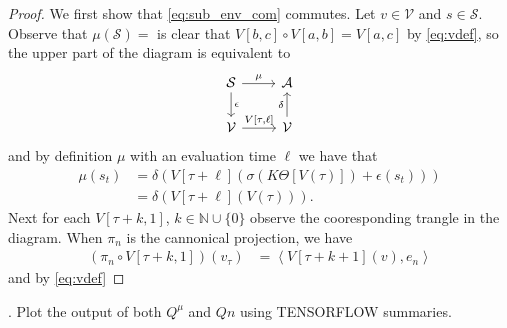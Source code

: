\documentclass{article} %
\numberwithin{equation}{subsection}
\numberwithin{theorem}{subsection}
\def\scriptv{{\mathcal V}}
\def\scripta{{\mathcal A}}
\def\scripts{{\mathcal S}}
\begin{document}
\begin{proof}
	We first show that \eqref{eq:sub_env_com} commutes. Let $v \in \scriptv$ and $s \in \scripts$. Observe that
	$\mu(\scripts) = $
	 is clear that $V[b,c]\circ V[a,b] = V[a,c]$ by \eqref{eq:vdef}, so
	the upper part of the diagram is equivalent to 
	\begin{equation}
		\begin{tikzcd}
			\scripts \arrow{r}{\mu}\arrow{d}{\epsilon} & \scripta \\
			\scriptv \arrow{r}{V[\tau, \ell]} & \scriptv \arrow{u}{\delta}
		\end{tikzcd}
	\end{equation}
	and by definition $\mu$ with an evaluation time $\ell$ we have that
	\begin{equation}
		\begin{aligned}
			\mu(s_t) &= \delta(V[\tau + \ell]( \sigma\left(K\Theta[V(\tau)]\right) + \epsilon(s_t))) \\
			 		 &= \delta(V[\tau + \ell](V(\tau))).
		\end{aligned}
	\end{equation}
	Next for each $V[\tau+k,1]$, $k\in \mathbb{N} \cup \{0\}$ observe the cooresponding trangle in the diagram. When $\pi_n$ is the cannonical projection, we have
	\begin{equation}
		\begin{aligned}
			\left(\pi_n \circ V[\tau+k, 1]\right)(v_\tau) &= \left\langle V[\tau+k+1](v), e_n\right\rangle
		\end{aligned}
	\end{equation}
	and by \eqref{eq:vdef}

\end{proof}


 




. Plot the output of both $Q^\mu$ and $Qn$ using TENSORFLOW summaries.
\end{document}
